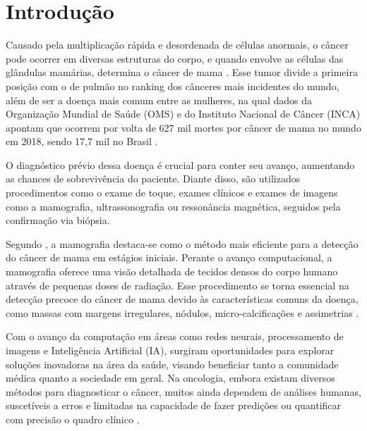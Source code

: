
\section{\esp Introdução} \label{intro}


Causado pela multiplicação rápida e desordenada de células anormais, o câncer pode ocorrer em diversas estruturas do corpo, e quando envolve as células das glândulas mamárias, determina o câncer de mama \cite{incaoquee}. Esse tumor divide a primeira posição com o de pulmão no ranking dos cânceres mais incidentes do mundo, além de ser a doença mais comum entre as mulheres, na qual dados da Organização Mundial de Saúde (OMS) e do Instituto Nacional de Câncer (INCA) apontam que ocorrem por volta de 627 mil mortes por câncer de mama no mundo em 2018, sendo 17,7 mil no Brasil \cite{boletimepidemiologico}.

O diagnóstico prévio dessa doença é crucial para conter seu avanço, aumentando as chances de sobrevivência do paciente. Diante disso, são utilizados procedimentos como o exame de toque, exames clínicos e exames de imagens como a mamografia, ultrassonografia ou ressonância magnética, seguidos pela confirmação via biópsia.

Segundo , a mamografia destaca-se como o método mais eficiente para a detecção do câncer de mama em estágios iniciais. Perante o avanço computacional, a mamografia oferece uma visão detalhada de tecidos densos do corpo humano através de pequenas doses de radiação. Esse procedimento se torna essencial na detecção precoce do câncer de mama devido às características comuns da doença, como massas com margens irregulares, nódulos, micro-calcificações e assimetrias \cite{detection}.

Com o avanço da computação em áreas como redes neurais, processamento de imagens e Inteligência Artificial (IA), surgiram oportunidades para explorar soluções inovadoras na área da saúde, visando beneficiar tanto a comunidade médica quanto a sociedade em geral. Na oncologia, embora existam diversos métodos para diagnosticar o câncer, muitos ainda dependem de análises humanas, suscetíveis a erros e limitadas na capacidade de fazer predições ou quantificar com precisão o quadro clínico \cite{parametrization}.

